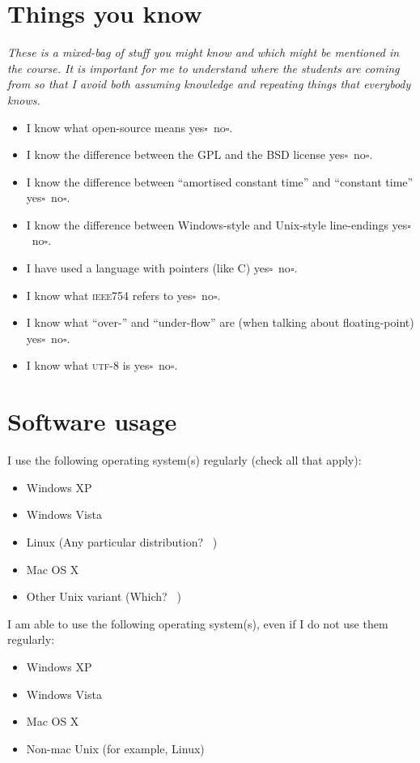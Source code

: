 \documentclass[article,twoside]{memoir}
\newcommand*{\fillunderscore}{~\hrulefill}
\newcommand*{\checkbox}{$\square$}
\newcommand*{\yesno}{\hfill\mbox{yes\checkbox~no\checkbox}}
\newcommand{\header}[1]{\textsl{#1}\par\medskip}
\begin{document}
\section{Things you know}
\header{These is a mixed-bag of stuff you might know and which might be mentioned in the course. It is important for me to understand where the students are coming from so that I avoid both assuming knowledge and repeating things that everybody knows.}

\begin{itemize}
\item I know what open-source means \yesno.
\item I know the difference between the GPL and the BSD license \yesno.
\item I know the difference between ``amortised constant time'' and ``constant time'' \yesno.
\item I know the difference between Windows-style and Unix-style line-endings \yesno.
\item I have used a language with pointers (like C) \yesno.
\item I know what \textsc{ieee754} refers to \yesno.
\item I know what ``over-'' and ``under-flow'' are (when talking about floating-point) \yesno.
\item I know what \textsc{utf-8} is \yesno.
\end{itemize}


\section{Software usage}

I use the following operating system(s) regularly (check all that apply):
\begin{itemize}[\checkbox]
\item Windows XP
\item Windows Vista
\item Linux (Any particular distribution? \fillunderscore)
\item Mac OS X
\item Other Unix variant (Which? \fillunderscore)
\end{itemize}

\medskip

I am able to use the following operating system(s), even if I do not use them regularly:
\begin{itemize}[\checkbox]
\item Windows XP
\item Windows Vista
\item Mac OS X
\item Non-mac Unix (for example, Linux)
\end{itemize}
\end{document}

